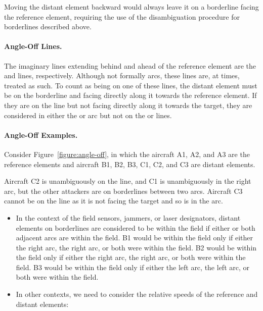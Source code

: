 {Moving the distant element backward would always leave it on a borderline facing the reference element, requiring the use of the disambiguation procedure for borderlines described above.

\paragraph{Angle-Off Lines.} The imaginary lines extending behind and ahead of the reference element are the  and  lines, respectively. Although not formally arcs, these lines are, at times, treated as such. To count as being on one of these lines, the distant element must be on the borderline and facing directly along it towards the reference element. If they are on the line but not facing directly along it towards the target, they are considered in either the  or  arc but not on the  or  lines.

\paragraph{Angle-Off Examples.}

Consider Figure~\ref{figure:angle-off}, in which the aircraft A1, A2, and A3 are the reference elements and aircraft B1, B2,  B3, C1, C2, and C3 are distant elements. 

Aircraft C2 is unambiguously on the  line, and C1 is unambiguously in the right  arc, but the other attackers are on borderlines between two arcs. Aircraft C3 cannot be on the  line as it is not facing the target and so is in the  arc.

\begin{itemize}

\item
In the context of the field sensors, jammers, or laser designators, distant elements on borderlines are considered to be within the field if either or both adjacent arcs are within the field. B1 would be within the field only if either the right  arc, the right  arc, or both were within the field. B2 would be within the field only if either the right  arc, the right  arc, or both were within the field. B3 would be within the field only if either the left  arc, the left  arc, or both were within the field.

\item In other contexts, we need to consider the relative speeds of the reference and distant elements:


\end{itemize}}
